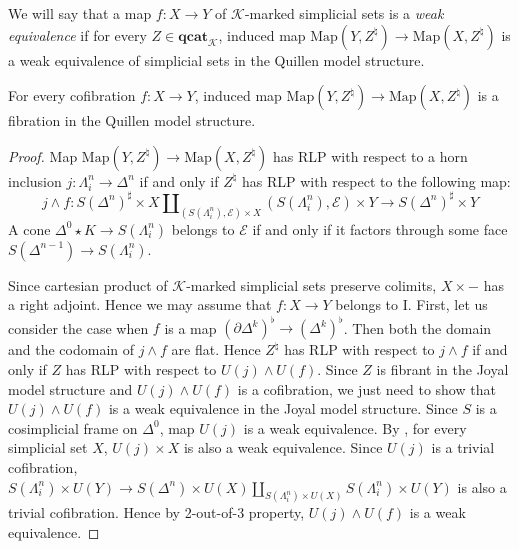 \documentclass[reqno]{amsart}
\theoremstyle{definition}
\theoremstyle{remark}
\newcommand{\cat}[1]{\mathbf{#1}}
\newcommand{\K}{$\mathcal{K}$}
\newcommand{\cqCat}{\cat{qcat}_\mathcal{K}}
\newcommand{\join}{\star}
\newcommand{\Map}{\mathrm{Map}}
\newcommand{\I}{\mathrm{I}}
\numberwithin{figure}{section}
\begin{document}
We will say that a map $f : X \to Y$ of \K-marked simplicial sets is a \emph{weak equivalence} if for every $Z \in \cqCat$,
induced map $\Map(Y,Z^\natural) \to \Map(X,Z^\natural)$ is a weak equivalence of simplicial sets in the Quillen model structure.

\begin{prop}
For every cofibration $f : X \to Y$, induced map $\Map(Y,Z^\natural) \to \Map(X,Z^\natural)$ is a fibration in the Quillen model structure.
\end{prop}
\begin{proof}
Map $\Map(Y,Z^\natural) \to \Map(X,Z^\natural)$ has RLP with respect to a horn inclusion $j : \Lambda^n_i \to \Delta^n$ if and only if $Z^\natural$ has RLP with respect to the following map:
\[ j \wedge f : S(\Delta^n)^\sharp \times X \amalg_{(S(\Lambda^n_i),\mathcal{E}) \times X} (S(\Lambda^n_i),\mathcal{E}) \times Y \to S(\Delta^n)^\sharp \times Y \]
A cone $\Delta^0 \join K \to S(\Lambda^n_i)$ belongs to $\mathcal{E}$ if and only if it factors through some face $S(\Delta^{n-1}) \to S(\Lambda^n_i)$.

Since cartesian product of \K-marked simplicial sets preserve colimits, $X \times -$ has a right adjoint.
Hence we may assume that $f : X \to Y$ belongs to $\I$.
First, let us consider the case when $f$ is a map $(\partial \Delta^k)^\flat \to (\Delta^k)^\flat$.
Then both the domain and the codomain of $j \wedge f$ are flat.
Hence $Z^\natural$ has RLP with respect to $j \wedge f$ if and only if $Z$ has RLP with respect to $U(j) \wedge U(f)$.
Since $Z$ is fibrant in the Joyal model structure and $U(j) \wedge U(f)$ is a cofibration,
we just need to show that $U(j) \wedge U(f)$ is a weak equivalence in the Joyal model structure.
Since $S$ is a cosimplicial frame on $\Delta^0$, map $U(j)$ is a weak equivalence.
By \cite[Corollary~2.2.5.4]{lurie-topos}, for every simplicial set $X$, $U(j) \times X$ is also a weak equivalence.
Since $U(j)$ is a trivial cofibration, $S(\Lambda^n_i) \times U(Y) \to S(\Delta^n) \times U(X) \amalg_{S(\Lambda^n_i) \times U(X)} S(\Lambda^n_i) \times U(Y)$ is also a trivial cofibration.
Hence by 2-out-of-3 property, $U(j) \wedge U(f)$ is a weak equivalence.


\end{proof}
\end{document}
